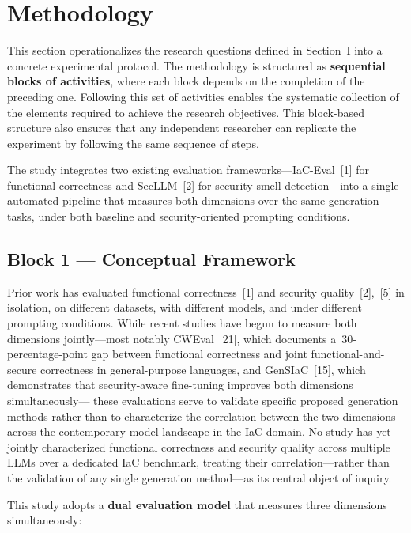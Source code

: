 \section{Methodology}
\label{sec:methodology}

This section operationalizes the research questions defined in
Section~I into a concrete experimental protocol. The methodology is
structured as \textbf{sequential blocks of activities}, where each
block depends on the completion of the preceding one. Following this
set of activities enables the systematic collection of the elements
required to achieve the research objectives. This block-based
structure also ensures that any independent researcher can replicate
the experiment by following the same sequence of steps.

The study integrates two existing evaluation frameworks---IaC-Eval~[1]
for functional correctness and SecLLM~[2] for security smell
detection---into a single automated pipeline that measures both
dimensions over the same generation tasks, under both baseline and
security-oriented prompting conditions.

\subsection{Block 1 --- Conceptual Framework}
\label{sec:block1}

Prior work has evaluated functional correctness~[1] and security
quality~[2],~[5] in isolation, on different datasets, with different
models, and under different prompting conditions. While recent studies
have begun to measure both dimensions jointly---most notably
CWEval~[21], which documents a~30-percentage-point gap between
functional correctness and joint functional-and-secure correctness in
general-purpose languages, and GenSIaC~[15], which demonstrates that
security-aware fine-tuning improves both dimensions simultaneously---
these evaluations serve to validate specific proposed generation
methods rather than to characterize the correlation between the two
dimensions across the contemporary model landscape in the IaC domain.
No study has yet jointly characterized functional correctness and
security quality across multiple LLMs over a dedicated IaC benchmark,
treating their correlation---rather than the validation of any single
generation method---as its central object of inquiry.

This study adopts a \textbf{dual evaluation model} that measures
three dimensions simultaneously:

